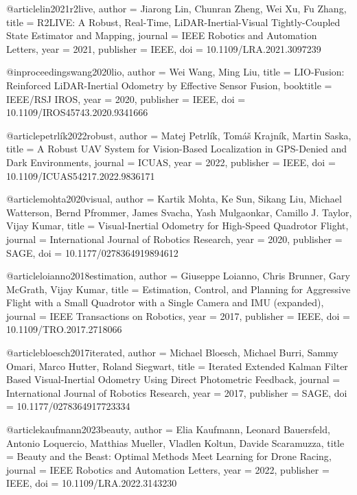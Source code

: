 @article{lin2021r2live,
  author = {Jiarong Lin, Chunran Zheng, Wei Xu, Fu Zhang},
  title = {R2LIVE: A Robust, Real-Time, LiDAR-Inertial-Visual Tightly-Coupled State Estimator and Mapping},
  journal = {IEEE Robotics and Automation Letters},
  year = {2021},
  publisher = {IEEE},
  doi = {10.1109/LRA.2021.3097239}
}

@inproceedings{wang2020lio,
  author = {Wei Wang, Ming Liu},
  title = {LIO-Fusion: Reinforced LiDAR-Inertial Odometry by Effective Sensor Fusion},
  booktitle = {IEEE/RSJ IROS},
  year = {2020},
  publisher = {IEEE},
  doi = {10.1109/IROS45743.2020.9341666}
}

@article{petrlík2022robust,
  author = {Matej Petrlík, Tomáš Krajník, Martin Saska},
  title = {A Robust UAV System for Vision-Based Localization in GPS-Denied and Dark Environments},
  journal = {ICUAS},
  year = {2022},
  publisher = {IEEE},
  doi = {10.1109/ICUAS54217.2022.9836171}
}

@article{mohta2020visual,
  author = {Kartik Mohta, Ke Sun, Sikang Liu, Michael Watterson, Bernd Pfrommer, James Svacha, Yash Mulgaonkar, Camillo J. Taylor, Vijay Kumar},
  title = {Visual-Inertial Odometry for High-Speed Quadrotor Flight},
  journal = {International Journal of Robotics Research},
  year = {2020},
  publisher = {SAGE},
  doi = {10.1177/0278364919894612}
}

@article{loianno2018estimation,
  author = {Giuseppe Loianno, Chris Brunner, Gary McGrath, Vijay Kumar},
  title = {Estimation, Control, and Planning for Aggressive Flight with a Small Quadrotor with a Single Camera and IMU (expanded)},
  journal = {IEEE Transactions on Robotics},
  year = {2017},
  publisher = {IEEE},
  doi = {10.1109/TRO.2017.2718066}
}

@article{bloesch2017iterated,
  author = {Michael Bloesch, Michael Burri, Sammy Omari, Marco Hutter, Roland Siegwart},
  title = {Iterated Extended Kalman Filter Based Visual-Inertial Odometry Using Direct Photometric Feedback},
  journal = {International Journal of Robotics Research},
  year = {2017},
  publisher = {SAGE},
  doi = {10.1177/0278364917723334}
}

@article{kaufmann2023beauty,
  author = {Elia Kaufmann, Leonard Bauersfeld, Antonio Loquercio, Matthias Mueller, Vladlen Koltun, Davide Scaramuzza},
  title = {Beauty and the Beast: Optimal Methods Meet Learning for Drone Racing},
  journal = {IEEE Robotics and Automation Letters},
  year = {2022},
  publisher = {IEEE},
  doi = {10.1109/LRA.2022.3143230}
}

